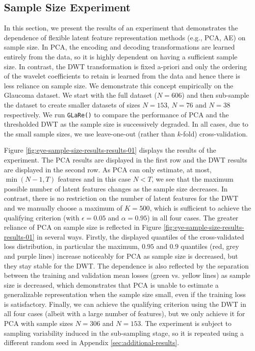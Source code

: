 \subsection{Sample Size Experiment}\label{sec:sample-size-experiment}

In this section, we present the results of an experiment that demonstrates the dependence of flexible latent feature representation methods (e.g., PCA, AE) on sample size.
In PCA, the encoding and decoding transformations are learned entirely from the data, so it is highly dependent on having a sufficient sample size.
In contrast, the DWT transformation is fixed a-priori and only the ordering of the wavelet coefficients to retain is learned from the data and hence there is less reliance on sample size.
We demonstrate this concept empirically on the Glaucoma dataset. 
We start with the full dataset ($N=606$) and then sub-sample the dataset to create smaller datasets of sizes $N=153$, $N=76$ and $N=38$ respectively.
We run \texttt{GLaRe()} to compare the performance of PCA and the thresholded DWT as the sample size is successively degraded.
In all cases, due to the small sample sizes, we use leave-one-out (rather than $k$-fold) cross-validation.

Figure \ref{fig:eye-sample-size-results-results-01} displays the results of the experiment.
The PCA results are displayed in the first row and the DWT results are displayed in the second row.
As PCA can only estimate, at most, $\min(N-1, T)$ features and in this case $N<T$, we see that the maximum possible number of latent features changes as the sample size decreases.
In contrast, there is no restriction on the number of latent features for the DWT and we manually choose a maximum of $K=500$, which is sufficient to achieve the qualifying criterion (with $\epsilon=0.05$ and $\alpha=0.95$) in all four cases.
The greater reliance of PCA on sample size is reflected in Figure \ref{fig:eye-sample-size-results-results-01} in several ways.
Firstly, the displayed quantiles of the cross-validated loss distribution, in particular the maximum, $0.95$ and $0.9$ quantiles (red, grey and purple lines) increase noticeably for PCA as sample size is decreased, but they stay stable for the DWT.
The dependence is also reflected by the separation between the training and validation mean losses (green vs. yellow lines) as sample size is decreased, which demonstrates that PCA is unable to estimate a generalizable representation when the sample size small, even if the training loss is satisfactory.
Finally, we can achieve the qualifying criterion using the DWT in all four cases (albeit with a large number of features), but we only achieve it for PCA with sample sizes $N=306$ and $N=153$.
The experiment is subject to sampling variability induced in the sub-sampling stage, so it is repeated using a different random seed in Appendix \ref{sec:additional-results}.


